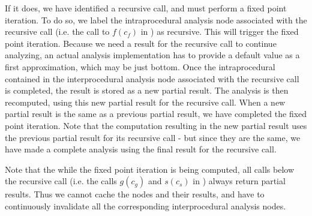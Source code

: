 If it does, we have identified a recursive call, and must perform a
fixed point iteration. To do so, we label the intraprocedural analysis
node associated with the recursive call (i.e. the call to $f(c_f)$
in )  as recursive. This will trigger the fixed point
iteration.  Because we need a result for the recursive call to
continue analyzing, an actual analysis implementation has to provide a
default value as a first approximation, which may be just bottom.
Once the intraprocedural contained in the interprocedural analysis
node associated with the recursive call is completed, the result is
stored as a new partial result. The analysis is then recomputed, using
this new partial result for the recursive call. When a new partial
result is the same as a previous partial result, we have completed the
fixed point iteration. Note that the computation resulting in the new
partial result uses the previous partial result for its recursive call
- but since they are the same, we have made a complete analysis using
the final result for the recursive call.

Note that the while the fixed point iteration is being computed, all
calls below the recursive call (i.e. the calls $g(c_g)$ and $s(c_s)$
in ) always return partial results. Thus we
cannot cache the nodes and their results, and have to continuously
invalidate all the corresponding interprocedural analysis nodes.


